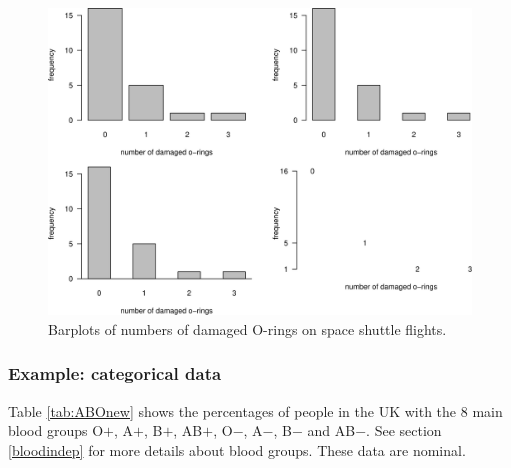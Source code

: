 \documentclass[
  11pt,
  british,
  openany, a4paper]{book}
\begin{document}
\begin{figure}

{\centering \includegraphics[width=0.75\linewidth]{images/shuttle_barplots} 

}

\caption{Barplots of numbers of damaged O-rings on space shuttle flights.}\label{fig:shuttlebarplots}
\end{figure}

\hypertarget{example-categorical-data}{%
\subsubsection*{Example: categorical data}\label{example-categorical-data}}

Table \ref{tab:ABOnew} shows the percentages of people in the UK with the 8 main blood groups O\(+\), A\(+\), B\(+\), AB\(+\), O\(-\), A\(-\), B\(-\) and AB\(-\). See section \ref{bloodindep} for more details about blood groups. These data are nominal.

 
  \providecommand{\huxb}[2]{\arrayrulecolor[RGB]{#1}\global\arrayrulewidth=#2pt}
  \providecommand{\huxvb}[2]{\color[RGB]{#1}\vrule width #2pt}
  \providecommand{\huxtpad}[1]{\rule{0pt}{#1}}
  \providecommand{\huxbpad}[1]{\rule[-#1]{0pt}{#1}}
\end{document}
